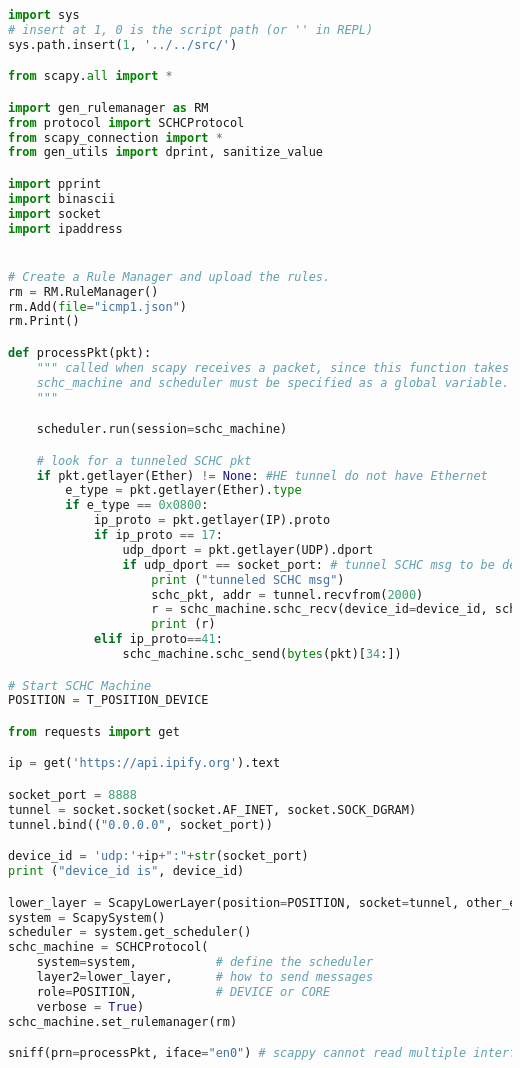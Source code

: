 \documentclass[onecolumn,12pt]{book}
\newcounter{c}
\begin{document}
\begin{lstlisting}[language=Python, caption={Program ping\_device1.py}, label=prog-ping-device1, basicstyle=\ttfamily\scriptsize]
import sys
# insert at 1, 0 is the script path (or '' in REPL)
sys.path.insert(1, '../../src/')

from scapy.all import *

import gen_rulemanager as RM
from protocol import SCHCProtocol
from scapy_connection import *
from gen_utils import dprint, sanitize_value

import pprint
import binascii
import socket
import ipaddress


# Create a Rule Manager and upload the rules.
rm = RM.RuleManager()
rm.Add(file="icmp1.json")
rm.Print()

def processPkt(pkt):
    """ called when scapy receives a packet, since this function takes only one argument,
    schc_machine and scheduler must be specified as a global variable.
    """

    scheduler.run(session=schc_machine)

    # look for a tunneled SCHC pkt
    if pkt.getlayer(Ether) != None: #HE tunnel do not have Ethernet
        e_type = pkt.getlayer(Ether).type
        if e_type == 0x0800:
            ip_proto = pkt.getlayer(IP).proto
            if ip_proto == 17:
                udp_dport = pkt.getlayer(UDP).dport
                if udp_dport == socket_port: # tunnel SCHC msg to be decompressed
                    print ("tunneled SCHC msg")                    
                    schc_pkt, addr = tunnel.recvfrom(2000)
                    r = schc_machine.schc_recv(device_id=device_id, schc_packet=schc_pkt)
                    print (r)
            elif ip_proto==41:
                schc_machine.schc_send(bytes(pkt)[34:])

# Start SCHC Machine
POSITION = T_POSITION_DEVICE

from requests import get

ip = get('https://api.ipify.org').text

socket_port = 8888
tunnel = socket.socket(socket.AF_INET, socket.SOCK_DGRAM)
tunnel.bind(("0.0.0.0", socket_port))

device_id = 'udp:'+ip+":"+str(socket_port)
print ("device_id is", device_id)

lower_layer = ScapyLowerLayer(position=POSITION, socket=tunnel, other_end=None)
system = ScapySystem()
scheduler = system.get_scheduler()
schc_machine = SCHCProtocol(
    system=system,           # define the scheduler
    layer2=lower_layer,      # how to send messages
    role=POSITION,           # DEVICE or CORE
    verbose = True)         
schc_machine.set_rulemanager(rm)

sniff(prn=processPkt, iface="en0") # scappy cannot read multiple interfaces

\end{lstlisting}
\end{document}

